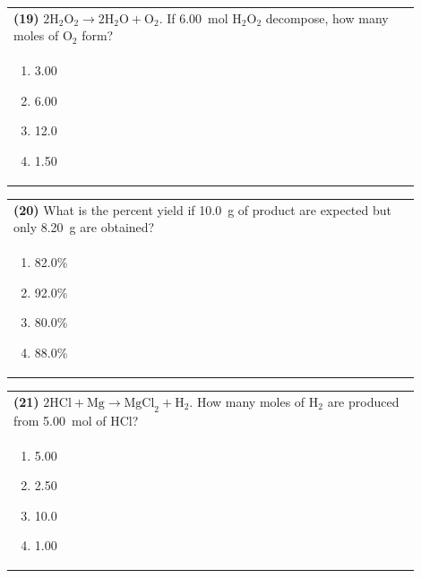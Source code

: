 \documentclass{article}
\begin{document}
{{\vspace{0.2cm}
\noindent\begin{tabular}{|p{0.9\linewidth}|}
\hline
\textbf{(19)} $2\text{H}_2\text{O}_2 \rightarrow 2\text{H}_2\text{O} + \text{O}_2$. If 6.00~mol H$_2$O$_2$ decompose, how many moles of O$_2$ form?\\[0.2cm]

\begin{minipage}[t]{0.85\linewidth}
\begin{enumerate}[label=\alph*.]
\item 3.00
\item 6.00
\item 12.0
\item 1.50
\end{enumerate}
\end{minipage}\\[0.2cm]
\hline
\end{tabular}

\vspace{0.2cm}
\noindent\begin{tabular}{|p{0.9\linewidth}|}
\hline
\textbf{(20)} What is the percent yield if 10.0~g of product are expected but only 8.20~g are obtained?\\[0.2cm]

\begin{minipage}[t]{0.85\linewidth}
\begin{enumerate}[label=\alph*.]
\item 82.0\%
\item 92.0\%
\item 80.0\%
\item 88.0\%
\end{enumerate}
\end{minipage}\\[0.2cm]
\hline
\end{tabular}

\newpage

\noindent\begin{tabular}{|p{0.9\linewidth}|}
\hline
\textbf{(21)} $2\text{HCl} + \text{Mg} \rightarrow \text{MgCl}_2 + \text{H}_2$. How many moles of H$_2$ are produced from 5.00~mol of HCl?\\[0.2cm]

\begin{minipage}[t]{0.85\linewidth}
\begin{enumerate}[label=\alph*.]
\item 5.00
\item 2.50
\item 10.0
\item 1.00
\end{enumerate}
\end{minipage}\\[0.2cm]
\hline
\end{tabular}

}}
\end{document}
